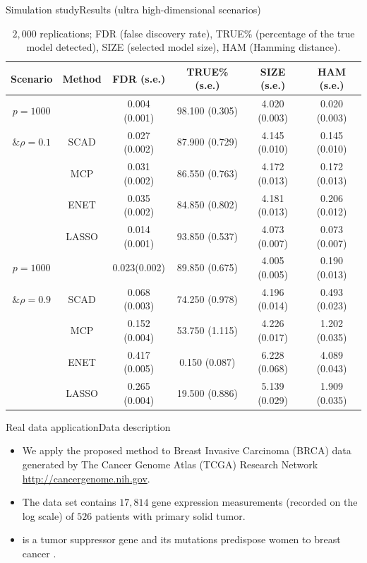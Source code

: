 \documentclass[citecolor=blue,10pt]{beamer}
\newcommand{\0} {\mbox{\boldmath$0$}}
\begin{document}
\begin{frame}{Simulation study}{Results (ultra high-dimensional scenarios)}
{\footnotesize
\begin{table}[H]
 \centering 
 \caption{$2,000$ replications; FDR (false discovery rate), TRUE\% (percentage of the true model detected), SIZE (selected model size), HAM (Hamming distance).}\label{T:sim2}
 \begin{tabular}{cc|c|c|c|c}
  \hline
  Scenario & Method                         & FDR  (s.e.)    & TRUE\% (s.e.)   & SIZE (s.e.)     & HAM (s.e.)    \\
  \hline
   $p=1000$        & {\color{red}{Proposed}} & 0.004 (0.001)   & 98.100 (0.305)  & 4.020 (0.003)    & 0.020 (0.003) \\
   $\&\rho=0.1$& SCAD                           & 0.027 (0.002)  & 87.900 (0.729)  & 4.145 (0.010)   & 0.145 (0.010) \\
           & MCP                            & 0.031 (0.002)  & 86.550 (0.763)  & 4.172 (0.013)   & 0.172 (0.013) \\
           & ENET                           & 0.035 (0.002)  & 84.850 (0.802)  & 4.181 (0.013)   & 0.206 (0.012) \\
           & LASSO                          & 0.014 (0.001)  & 93.850 (0.537)  & 4.073 (0.007)   & 0.073 (0.007) \\
  \hline
    $p=1000$       & {\color{red}{Proposed}} & 0.023(0.002)   & 89.850 (0.675)  & 4.005 (0.005) & 0.190 (0.013) \\
    $\&\rho=0.9$& SCAD                           & 0.068 (0.003)  & 74.250 (0.978)  & 4.196 (0.014)   & 0.493 (0.023) \\
           & MCP                            & 0.152 (0.004)  & 53.750 (1.115)  & 4.226 (0.017)   & 1.202 (0.035) \\
           & ENET                           & 0.417 (0.005)  & 0.150 (0.087)   & 6.228 (0.068)   & 4.089 (0.043) \\
           & LASSO                          & 0.265 (0.004)  & 19.500 (0.886)  & 5.139 (0.029)   & 1.909 (0.035) \\
  \hline
 \end{tabular}
\end{table}}
\end{frame}


\begin{frame}{Real data application}{Data description}
\begin{itemize}\itemsep=4mm
\item We apply the proposed method to Breast Invasive Carcinoma (BRCA) data generated by The Cancer Genome Atlas (TCGA) Research Network \url{http://cancergenome.nih.gov}. 
\item The data set contains $17,814$ gene expression measurements (recorded on the log scale) of $526$ patients with primary solid tumor. 
\item {\color{red}{BRCA1}} is a tumor suppressor gene and its mutations predispose women to breast cancer \citep{findlay2018accurate}. 

\end{itemize}
\end{frame}
\end{document}
